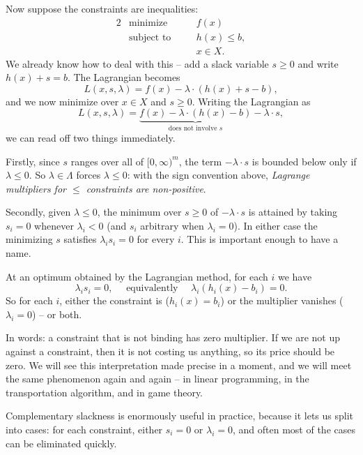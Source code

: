 Now suppose the constraints are inequalities:
\begin{alignat*}{2}
    & \text{minimize} \quad && f(x) \\
    & \text{subject to} \quad && h(x) \leq b, \\
    & && x \in X.
\end{alignat*}
We already know how to deal with this -- add a slack variable $s \geq 0$ and write $h(x) + s = b$. The Lagrangian becomes
$$
L(x, s, \lambda) = f(x) - \lambda \cdot (h(x) + s - b),
$$
and we now minimize over $x \in X$ and $s \geq 0$. Writing the Lagrangian as
$$
L(x, s, \lambda) = \underbrace{f(x) - \lambda\cdot(h(x) - b)}_{\text{does not involve }s} - \lambda \cdot s,
$$
we can read off two things immediately.

Firstly, since $s$ ranges over all of $[0, \infty)^m$, the term $-\lambda \cdot s$ is bounded below only if $\lambda \leq 0$. So $\lambda \in \Lambda$ forces $\lambda \leq 0$: with the sign convention above, \emph{Lagrange multipliers for $\leq$ constraints are non-positive}.

Secondly, given $\lambda \leq 0$, the minimum over $s \geq 0$ of $-\lambda\cdot s$ is attained by taking $s_i = 0$ whenever $\lambda_i < 0$ (and $s_i$ arbitrary when $\lambda_i = 0$). In either case the minimizing $s$ satisfies $\lambda_i s_i = 0$ for every $i$. This is important enough to have a name.

\begin{theorem}
    At an optimum obtained by the Lagrangian method, for each $i$ we have
    $$
    \lambda_i s_i = 0, \quad\text{ equivalently }\quad \lambda_i\left(h_i(x) - b_i\right) = 0.
    $$
    So for each $i$, either the constraint is  ($h_i(x) = b_i$) or the multiplier vanishes ($\lambda_i = 0$) -- or both.
\end{theorem}

In words: a constraint that is not binding has zero multiplier. If we are not up against a constraint, then it is not costing us anything, so its price should be zero. We will see this interpretation made precise in a moment, and we will meet the same phenomenon again and again -- in linear programming, in the transportation algorithm, and in game theory.

Complementary slackness is enormously useful in practice, because it lets us split into cases: for each constraint, either $s_i = 0$ or $\lambda_i = 0$, and often most of the cases can be eliminated quickly.

